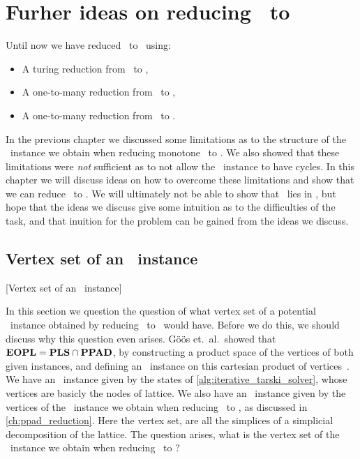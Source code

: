\setchapterpreamble[u]{\margintoc}
\chapter{Furher ideas on reducing \Tarski\ to \EOPL}\label{ch:eopl_reduction}

Until now we have reduced \Tarski\ to \EndOfLine\ using:
\begin{itemize}
	\item A turing reduction from \Tarski\ to \Tarskistar,
	\item A one-to-many reduction from \Tarskistar\ to \Sperner,
	\item A one-to-many reduction from \Sperner\ to \EndOfLine.
\end{itemize}
In the previous chapter we discussed some limitations as to the structure of the \Sperner\ instance we obtain when reducing monotone \Tarskistar\ to \Sperner. We also showed that these limitations were \emph{not} sufficient as to not allow the \EndOfLine\ instance to have cycles. In this chapter we will discuss ideas on how to overcome these limitations and show that we can reduce \Tarski\ to \EndOfPotentialLine\@. We will ultimately not be able to show that \Tarski\ lies in \EOPL, but hope that the ideas we discuss give some intuition as to the difficulties of the task, and that inuition for the problem can be gained from the ideas we discuss.

\section{Vertex set of an \EOPL\ instance}[Vertex set of an \EOPL\ instance]

In this section we question the question of what vertex set of a potential \EOPL\ instance obtained by reducing \Tarskistar\ to \EndOfPotentialLine\ would have. Before we do this, we should discuss why this question even arises. Göös et.\ al.\ showed that $\textbf{EOPL} = \textbf{PLS} \cap \textbf{PPAD}$, by constructing a product space of the vertices of both given instances, and defining an \EndOfPotentialLine\ instance on this cartesian product of vertices~. We have an \Localopt\ instance given by the states of \cref{alg:iterative_tarski_solver}, whose vertices are basicly the nodes of lattice. We also have an \EndOfLine\ instance given by the vertices of the \Sperner\ instance we obtain when reducing \Tarskistar\ to \Sperner, as discussed in \cref{ch:ppad_reduction}. Here the vertex set, are all the simplices of a simplicial decomposition of the lattice. The question arises, what is the vertex set of the \EndOfPotentialLine\ instance we obtain when reducing \Tarskistar\ to \EndOfLine\@?

